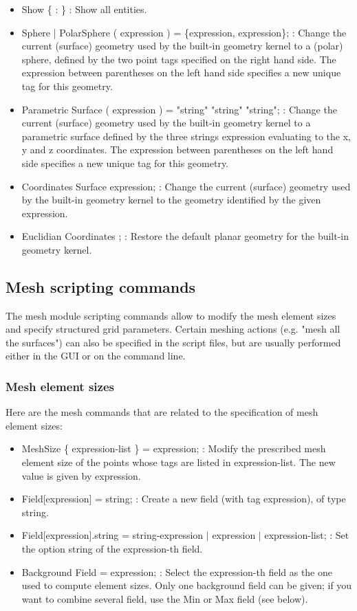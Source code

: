 \documentclass[dvipdfmx, 9pt, a4paper]{article}
\numberwithin{equation}{section}
\begin{document}
\begin{itemize}
\item Show \{ : \} : Show all entities.
\item Sphere | PolarSphere ( expression ) = \{expression, expression\}; : Change the current (surface) geometry used by the built-in geometry kernel to a (polar) sphere, defined by the two point tags specified on the right hand side. The expression between parentheses on the left hand side specifies a new unique tag for this geometry.
\item Parametric Surface ( expression ) = "string" "string" "string"; : Change the current (surface) geometry used by the built-in geometry kernel to a parametric surface defined by the three strings expression evaluating to the x, y and z coordinates. The expression between parentheses on the left hand side specifies a new unique tag for this geometry.
\item Coordinates Surface expression; : Change the current (surface) geometry used by the built-in geometry kernel to the geometry identified by the given expression.
\item Euclidian Coordinates ; : Restore the default planar geometry for the built-in geometry kernel.
\end{itemize}

\subsection{Mesh scripting commands}
The mesh module scripting commands allow to modify the mesh element sizes and specify structured grid parameters. Certain meshing actions (e.g. "mesh all the surfaces") can also be specified in the script files, but are usually performed either in the GUI or on the command line.

\subsubsection{Mesh element sizes}
Here are the mesh commands that are related to the specification of mesh element sizes:
\begin{itemize}
\item MeshSize \{ expression-list \} = expression; : Modify the prescribed mesh element size of the points whose tags are listed in expression-list. The new value is given by expression.
\item Field[expression] = string; : Create a new field (with tag expression), of type string.
\item Field[expression].string = string-expression $|$ expression $|$ expression-list; : Set the option string of the expression-th field.
\item Background Field = expression; : Select the expression-th field as the one used to compute element sizes. Only one background field can be given; if you want to combine several field, use the Min or Max field (see below).
\end{itemize}
\end{document}

